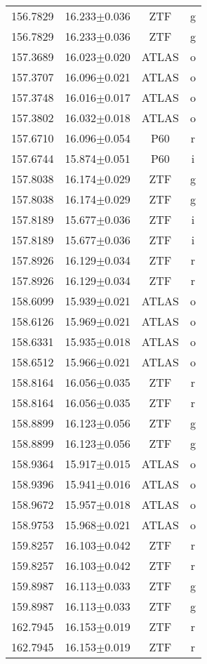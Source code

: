 \begin{table}
\begin{tabular}{cccc}
156.7829 & 16.233$\pm$0.036 & ZTF & g \\
156.7829 & 16.233$\pm$0.036 & ZTF & g \\
157.3689 & 16.023$\pm$0.020 & ATLAS & o \\
157.3707 & 16.096$\pm$0.021 & ATLAS & o \\
157.3748 & 16.016$\pm$0.017 & ATLAS & o \\
157.3802 & 16.032$\pm$0.018 & ATLAS & o \\
157.6710 & 16.096$\pm$0.054 & P60 & r \\
157.6744 & 15.874$\pm$0.051 & P60 & i \\
157.8038 & 16.174$\pm$0.029 & ZTF & g \\
157.8038 & 16.174$\pm$0.029 & ZTF & g \\
157.8189 & 15.677$\pm$0.036 & ZTF & i \\
157.8189 & 15.677$\pm$0.036 & ZTF & i \\
157.8926 & 16.129$\pm$0.034 & ZTF & r \\
157.8926 & 16.129$\pm$0.034 & ZTF & r \\
158.6099 & 15.939$\pm$0.021 & ATLAS & o \\
158.6126 & 15.969$\pm$0.021 & ATLAS & o \\
158.6331 & 15.935$\pm$0.018 & ATLAS & o \\
158.6512 & 15.966$\pm$0.021 & ATLAS & o \\
158.8164 & 16.056$\pm$0.035 & ZTF & r \\
158.8164 & 16.056$\pm$0.035 & ZTF & r \\
158.8899 & 16.123$\pm$0.056 & ZTF & g \\
158.8899 & 16.123$\pm$0.056 & ZTF & g \\
158.9364 & 15.917$\pm$0.015 & ATLAS & o \\
158.9396 & 15.941$\pm$0.016 & ATLAS & o \\
158.9672 & 15.957$\pm$0.018 & ATLAS & o \\
158.9753 & 15.968$\pm$0.021 & ATLAS & o \\
159.8257 & 16.103$\pm$0.042 & ZTF & r \\
159.8257 & 16.103$\pm$0.042 & ZTF & r \\
159.8987 & 16.113$\pm$0.033 & ZTF & g \\
159.8987 & 16.113$\pm$0.033 & ZTF & g \\
162.7945 & 16.153$\pm$0.019 & ZTF & r \\
162.7945 & 16.153$\pm$0.019 & ZTF & r \\

\end{tabular}
\end{table}
